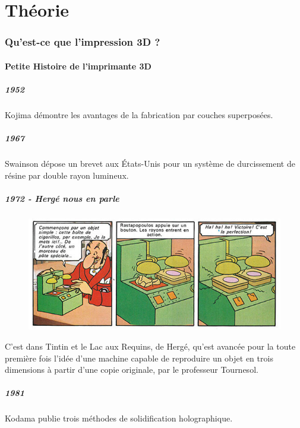 \documentclass{article}
\begin{document}
\part{Théorie}
\section{Qu'est-ce que l'impression 3D ?}
\subsection{Petite Histoire de l'imprimante 3D}
\subsubsection{1952}
Kojima démontre les avantages de la fabrication par couches superposées.
\subsubsection{1967}
Swainson dépose un brevet aux États-Unis pour un système de durcissement de résine par double rayon lumineux.
\subsubsection{1972 - Hergé nous en parle}
\begin{figure}[h!]
\centering
\includegraphics[scale=0.6]{./images/tintin.png}
\end{figure}
C'est dans Tintin et le Lac aux Requins, de Hergé, qu'est avancée pour la toute première fois l'idée d'une machine capable de reproduire un objet en trois dimensions à partir d'une copie originale, par le professeur Tournesol.
\subsubsection{1981}
Kodama publie trois méthodes de solidification holographique.
\end{document}
